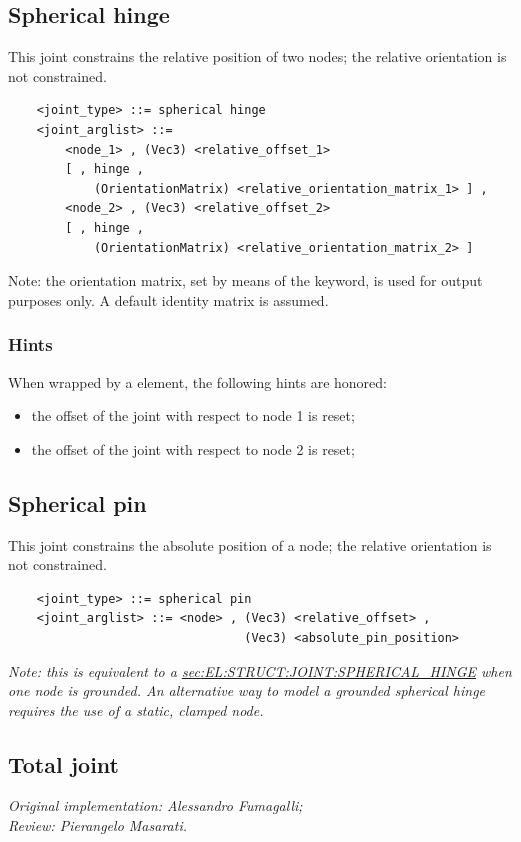 \subsection{Spherical hinge}
\label{sec:EL:STRUCT:JOINT:SPHERICAL_HINGE}
This joint constrains the relative position of two nodes;
the relative orientation is not constrained.
\begin{verbatim}
    <joint_type> ::= spherical hinge
    <joint_arglist> ::= 
        <node_1> , (Vec3) <relative_offset_1> 
        [ , hinge , 
            (OrientationMatrix) <relative_orientation_matrix_1> ] ,
        <node_2> , (Vec3) <relative_offset_2>
        [ , hinge , 
            (OrientationMatrix) <relative_orientation_matrix_2> ]
\end{verbatim}
Note: the orientation matrix, set by means of the  keyword,
is used for output purposes only. 
A default identity matrix is assumed.

\subsubsection{Hints}
When wrapped by a  element, the following hints are honored:
\begin{itemize}
\item {} the offset of the joint
with respect to node 1 is reset;
\item {} the offset of the joint
with respect to node 2 is reset;
\end{itemize}

\subsection{Spherical pin}
This joint constrains the absolute position of a node;
the relative orientation is not constrained.
\begin{verbatim}
    <joint_type> ::= spherical pin
    <joint_arglist> ::= <node> , (Vec3) <relative_offset> ,
                                 (Vec3) <absolute_pin_position>
\end{verbatim}
{\em
	Note: this is equivalent to a
	\hyperref{\kw{spherical hinge}}{\kw{spherical hinge} (see Section~}{)}{sec:EL:STRUCT:JOINT:SPHERICAL_HINGE}
	when one node is grounded.
	An alternative way to model a grounded spherical hinge requires
	the use of a static, clamped node.
}

\subsection{Total joint}
\label{sec:EL:STRUCT:JOINT:TOTAL_JOINT}
\emph{Original implementation: Alessandro Fumagalli; \\
Review: Pierangelo Masarati.}

